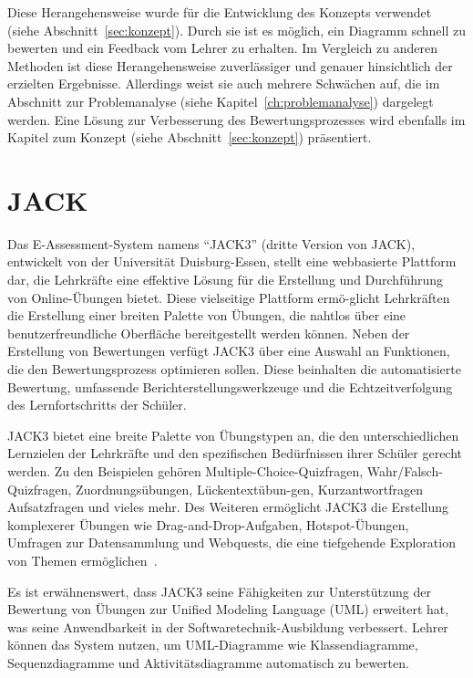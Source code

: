 Diese Herangehensweise wurde für die Entwicklung des Konzepts verwendet (siehe Abschnitt~\ref{sec:konzept}). Durch sie
ist es möglich, ein Diagramm schnell zu bewerten und ein Feedback vom Lehrer zu erhalten. Im Vergleich zu anderen
Methoden ist diese Herangehensweise zuverlässiger und genauer hinsichtlich der erzielten Ergebnisse. Allerdings weist
sie auch mehrere Schwächen auf, die im Abschnitt zur Problemanalyse (siehe Kapitel~\ref{ch:problemanalyse}) dargelegt
werden. Eine Lösung zur Verbesserung des Bewertungsprozesses wird ebenfalls im Kapitel zum Konzept
(siehe Abschnitt~\ref{sec:konzept}) präsentiert.


\section{JACK}

Das E-Assessment-System namens ``JACK3'' (dritte Version von JACK)\cite{jack}, entwickelt von der Universität
Duisburg-Essen, stellt eine webbasierte Plattform dar, die Lehrkräfte eine effektive Lösung für die Erstellung und
Durchführung von Online-Übungen bietet. Diese vielseitige Plattform ermö-glicht Lehrkräften die Erstellung einer breiten
Palette von Übungen, die nahtlos über eine benutzerfreundliche Oberfläche bereitgestellt werden können. Neben der
Erstellung von Bewertungen verfügt JACK3 über eine Auswahl an Funktionen, die den Bewertungsprozess optimieren sollen.
Diese beinhalten die automatisierte Bewertung, umfassende Berichterstellungswerkzeuge und die Echtzeitverfolgung des
Lernfortschritts der Schüler.

JACK3 bietet eine breite Palette von Übungstypen an, die den unterschiedlichen Lernzielen der Lehrkräfte und den
spezifischen Bedürfnissen ihrer Schüler gerecht werden. Zu den Beispielen gehören Multiple-Choice-Quizfragen,
Wahr/Falsch-Quizfragen, Zuordnungsübungen, Lückentextübun-gen, Kurzantwortfragen Aufsatzfragen und vieles mehr. Des
Weiteren ermöglicht JACK3 die Erstellung komplexerer Übungen wie Drag-and-Drop-Aufgaben, Hotspot-Übungen, Umfragen zur
Datensammlung und Webquests, die eine tiefgehende Exploration von Themen ermöglichen~\cite{jack}.

Es ist erwähnenswert, dass JACK3 seine Fähigkeiten zur Unterstützung der Bewertung von Übungen zur Unified Modeling
Language (UML) erweitert hat, was seine Anwendbarkeit in der Softwaretechnik-Ausbildung verbessert. Lehrer können das
System nutzen, um UML-Diagramme wie Klassendiagramme, Sequenzdiagramme und Aktivitätsdiagramme automatisch zu bewerten.


